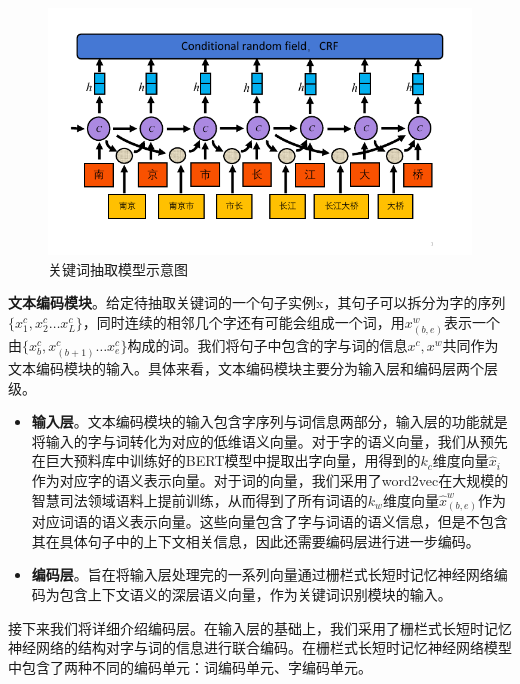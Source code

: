 \begin{figure}[ht]
    \centering
    \includegraphics[width=\linewidth]{figures/key_word}
    \caption{关键词抽取模型示意图}
    \label{fig:model2}
\end{figure}


\textbf{文本编码模块}。给定待抽取关键词的一个句子实例x，其句子可以拆分为字的序列$\{x_{1}^{c},x_{2}^{c}… x_{L}^{c}\}$，同时连续的相邻几个字还有可能会组成一个词，用$x_{(b,e)}^{w}$表示一个由$\{x_{b}^{c},x_{(b+1)}^{c}… x_{e}^{c}\}$构成的词。我们将句子中包含的字与词的信息${x^{c},x^{w}}$共同作为文本编码模块的输入。具体来看，文本编码模块主要分为输入层和编码层两个层级。
\begin{itemize}
	\item \textbf{输入层}。文本编码模块的输入包含字序列与词信息两部分，输入层的功能就是将输入的字与词转化为对应的低维语义向量。对于字的语义向量，我们从预先在巨大预料库中训练好的BERT模型中提取出字向量，用得到的$k_{c}$维度向量$\hat{x}_{i}$作为对应字的语义表示向量。对于词的向量，我们采用了word2vec在大规模的智慧司法领域语料上提前训练，从而得到了所有词语的$k_{w}$维度向量$\hat{x}_{(b,e)}^{w}$作为对应词语的语义表示向量。这些向量包含了字与词语的语义信息，但是不包含其在具体句子中的上下文相关信息，因此还需要编码层进行进一步编码。
	\item \textbf{编码层}。旨在将输入层处理完的一系列向量通过栅栏式长短时记忆神经网络编码为包含上下文语义的深层语义向量，作为关键词识别模块的输入。
\end{itemize}

接下来我们将详细介绍编码层。在输入层的基础上，我们采用了栅栏式长短时记忆神经网络的结构对字与词的信息进行联合编码。在栅栏式长短时记忆神经网络模型中包含了两种不同的编码单元：词编码单元、字编码单元。

